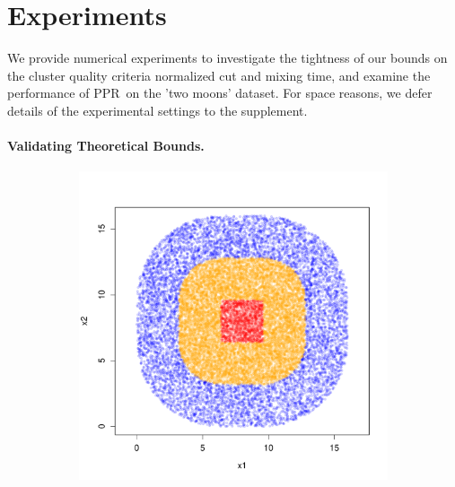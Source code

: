 \documentclass{article}
\newcommand{\1}{\mathbf{1}}
\newcommand{\pprspace}{{\sc PPR~}}
\theoremstyle{aldenthm}
\theoremstyle{aldenrmrk}
\begin{document}
\section{Experiments}
\label{sec: experiments}

We provide numerical experiments to investigate the tightness of our bounds on the cluster quality criteria normalized cut and mixing time, and examine the performance of \pprspace on the 'two moons' dataset. For space reasons, we defer details of the experimental settings to the supplement.

\paragraph{Validating Theoretical Bounds.}

\begin{figure}
	\centering
	\begin{adjustbox}{minipage=\linewidth,scale=0.8}
		\begin{subfigure}{.33\linewidth}
			\includegraphics[width=\linewidth]{example1plots/sample2}
			\caption{}
		\end{subfigure}
		\begin{subfigure}{.33\linewidth}

\end{subfigure}
\end{adjustbox}
\end{figure}
\end{document}

